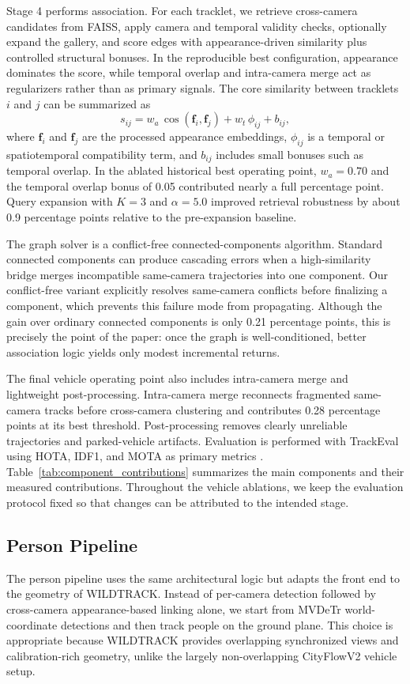\documentclass{ieeeaccess}
\begin{document}
Stage 4 performs association. For each tracklet, we retrieve cross-camera candidates from FAISS, apply camera and temporal validity checks, optionally expand the gallery, and score edges with appearance-driven similarity plus controlled structural bonuses. In the reproducible best configuration, appearance dominates the score, while temporal overlap and intra-camera merge act as regularizers rather than as primary signals. The core similarity between tracklets $i$ and $j$ can be summarized as
\begin{equation}
s_{ij} = w_a\,\cos(\mathbf{f}_i, \mathbf{f}_j) + w_t\,\phi_{ij} + b_{ij},
\end{equation}
where $\mathbf{f}_i$ and $\mathbf{f}_j$ are the processed appearance embeddings, $\phi_{ij}$ is a temporal or spatiotemporal compatibility term, and $b_{ij}$ includes small bonuses such as temporal overlap. In the ablated historical best operating point, $w_a=0.70$ and the temporal overlap bonus of 0.05 contributed nearly a full percentage point. Query expansion with $K=3$ and $\alpha=5.0$ improved retrieval robustness by about 0.9 percentage points relative to the pre-expansion baseline.

The graph solver is a conflict-free connected-components algorithm. Standard connected components can produce cascading errors when a high-similarity bridge merges incompatible same-camera trajectories into one component. Our conflict-free variant explicitly resolves same-camera conflicts before finalizing a component, which prevents this failure mode from propagating. Although the gain over ordinary connected components is only 0.21 percentage points, this is precisely the point of the paper: once the graph is well-conditioned, better association logic yields only modest incremental returns.

The final vehicle operating point also includes intra-camera merge and lightweight post-processing. Intra-camera merge reconnects fragmented same-camera tracks before cross-camera clustering and contributes 0.28 percentage points at its best threshold. Post-processing removes clearly unreliable trajectories and parked-vehicle artifacts. Evaluation is performed with TrackEval using HOTA, IDF1, and MOTA as primary metrics \cite{trackeval,hota}. Table~\ref{tab:component_contributions} summarizes the main components and their measured contributions. Throughout the vehicle ablations, we keep the evaluation protocol fixed so that changes can be attributed to the intended stage.

\subsection{Person Pipeline}
The person pipeline uses the same architectural logic but adapts the front end to the geometry of WILDTRACK. Instead of per-camera detection followed by cross-camera appearance-based linking alone, we start from MVDeTr world-coordinate detections and then track people on the ground plane. This choice is appropriate because WILDTRACK provides overlapping synchronized views and calibration-rich geometry, unlike the largely non-overlapping CityFlowV2 vehicle setup.
\end{document}
